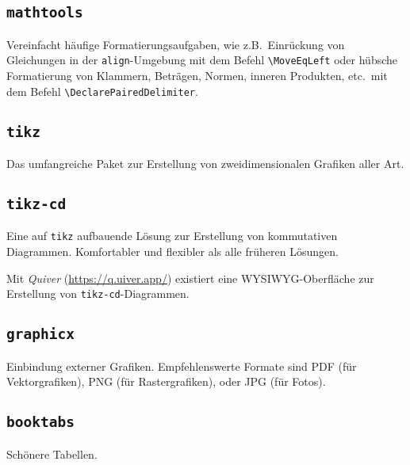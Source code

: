 \documentclass[11pt, a4paper, german]{article}
\theoremstyle{plain}
\theoremstyle{remark}
\theoremstyle{definition}
\numberwithin{equation}{section}
\numberwithin{theorem}{section}
\begin{document}
\subsection{\texttt{mathtools}}
Vereinfacht häufige Formatierungsaufgaben, wie z.B.\ Einrückung von Gleichungen in der \verb|align|-Umgebung mit dem Befehl \verb|\MoveEqLeft| oder hübsche Formatierung von Klammern, Beträgen, Normen, inneren Produkten, etc.\ mit dem Befehl \verb|\DeclarePairedDelimiter|.

\subsection{\texttt{tikz}}
Das umfangreiche Paket zur Erstellung von zweidimensionalen Grafiken aller Art.

\subsection{\texttt{tikz-cd}}
Eine auf \verb|tikz| aufbauende Lösung zur Erstellung von kommutativen Diagrammen.
Komfortabler und flexibler als alle früheren Lösungen.

Mit \emph{Quiver} (\url{https://q.uiver.app/}) existiert eine WYSIWYG-Ober\-fläche zur Erstellung von \verb|tikz-cd|-Diagrammen.

\subsection{\texttt{graphicx}}
Einbindung externer Grafiken.
Empfehlenswerte Formate sind PDF (für Vektorgrafiken), PNG (für Rastergrafiken), oder JPG (für Fotos).

\subsection{\texttt{booktabs}}
Schönere Tabellen.

\clearpage
{}
\printbibliography
\end{document}
